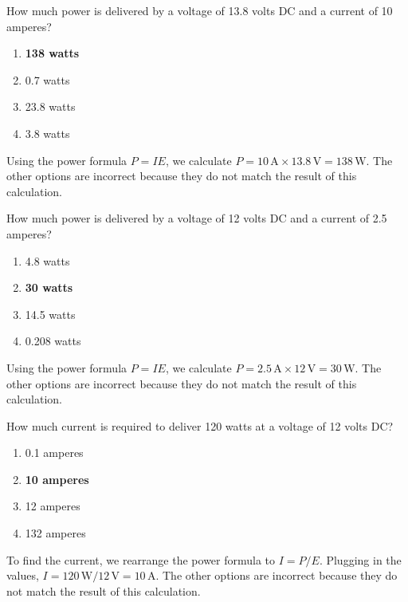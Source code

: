 \begin{tcolorbox}[colback=gray!10!white,colframe=black!75!black,title={T5C09}]
    How much power is delivered by a voltage of 13.8 volts DC and a current of 10 amperes?
    \begin{enumerate}[label=\Alph*),noitemsep]
        \item \textbf{138 watts}
        \item 0.7 watts
        \item 23.8 watts
        \item 3.8 watts
    \end{enumerate}
\end{tcolorbox}
Using the power formula \( P = I E \), we calculate \( P = 10 \, \text{A} \times 13.8 \, \text{V} = 138 \, \text{W} \). The other options are incorrect because they do not match the result of this calculation.

\begin{tcolorbox}[colback=gray!10!white,colframe=black!75!black,title={T5C10}]
    How much power is delivered by a voltage of 12 volts DC and a current of 2.5 amperes?
    \begin{enumerate}[label=\Alph*),noitemsep]
        \item 4.8 watts
        \item \textbf{30 watts}
        \item 14.5 watts
        \item 0.208 watts
    \end{enumerate}
\end{tcolorbox}
Using the power formula \( P = I E \), we calculate \( P = 2.5 \, \text{A} \times 12 \, \text{V} = 30 \, \text{W} \). The other options are incorrect because they do not match the result of this calculation.

\begin{tcolorbox}[colback=gray!10!white,colframe=black!75!black,title={T5C11}]
    How much current is required to deliver 120 watts at a voltage of 12 volts DC?
    \begin{enumerate}[label=\Alph*),noitemsep]
        \item 0.1 amperes
        \item \textbf{10 amperes}
        \item 12 amperes
        \item 132 amperes
    \end{enumerate}
\end{tcolorbox}
To find the current, we rearrange the power formula to \( I = P / E \). Plugging in the values, \( I = 120 \, \text{W} / 12 \, \text{V} = 10 \, \text{A} \). The other options are incorrect because they do not match the result of this calculation.
